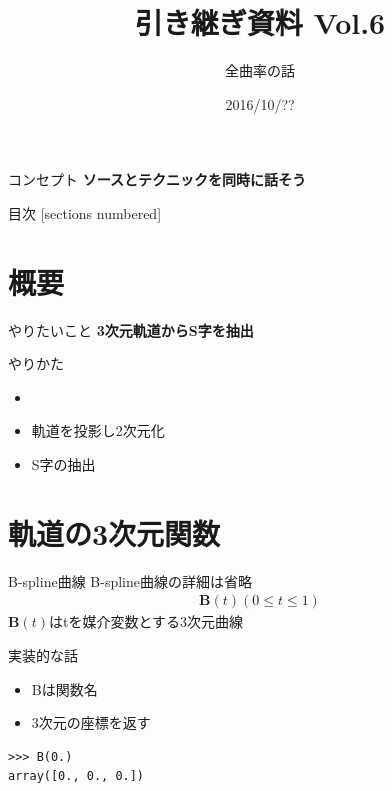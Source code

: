 \documentclass[12pt, xetex, xcolor=pdftex, dvipsnames]{beamer}
\title{引き継ぎ資料 Vol.6}
\subtitle{全曲率の話}
\date{2016/10/??}
\author{}
\institute{}
\renewcommand{\vec}{\textbf} %
\begin{document}
\maketitle
\begin{frame}{コンセプト}
    \alert{\textbf{ソースとテクニックを同時に話そう}}
\end{frame}

\begin{frame}{目次}
  [sections numbered]
  \tableofcontents[hideallsubsections]
\end{frame}

\section{概要}
\begin{frame}{やりたいこと}
\textbf{{\large 3次元軌道からS字を抽出}}
\end{frame}
\begin{frame}{やりかた}
    \begin{itemize}
        \item {}
        \item 軌道を投影し2次元化
        \item S字の抽出
    \end{itemize}
\end{frame}

\section{軌道の3次元関数}
\begin{frame}{B-spline曲線}
    B-spline曲線の詳細は省略
    \begin{align}
        \vec{B}(t) (0\leq t \leq 1)
    \end{align}
    $\vec{B}(t)$はtを媒介変数とする3次元曲線
\end{frame}
\begin{frame}[fragile]{実装的な話}
\begin{itemize}
\item Bは関数名
\item 3次元の座標を返す
\end{itemize}
\begin{lstlisting}
>>> B(0.)
array([0., 0., 0.])
\end{lstlisting}
\end{frame}
\end{document}
